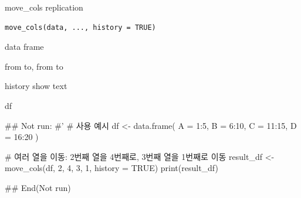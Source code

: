 \documentclass[a4paper]{book}
\begin{document}
%
\begin{Description}
move\_cols replication
\end{Description}
%
\begin{Usage}
\begin{verbatim}
move_cols(data, ..., history = TRUE)
\end{verbatim}
\end{Usage}
%
\begin{Arguments}
\begin{ldescription}
\item[\code{data}] data frame

\item[\code{...}] from to, from to

\item[\code{history}] history show text
\end{ldescription}
\end{Arguments}
%
\begin{Value}
df
\end{Value}
%
\begin{Examples}
\begin{ExampleCode}
\#\# Not run: 
#'
# 사용 예시
df <- data.frame(
  A = 1:5,
  B = 6:10,
  C = 11:15,
  D = 16:20
)

# 여러 열을 이동: 2번째 열을 4번째로, 3번째 열을 1번째로 이동
result_df <- move_cols(df, 2, 4, 3, 1, history = TRUE)
print(result_df)


## End(Not run)

\end{ExampleCode}
\end{Examples}
\end{document}
